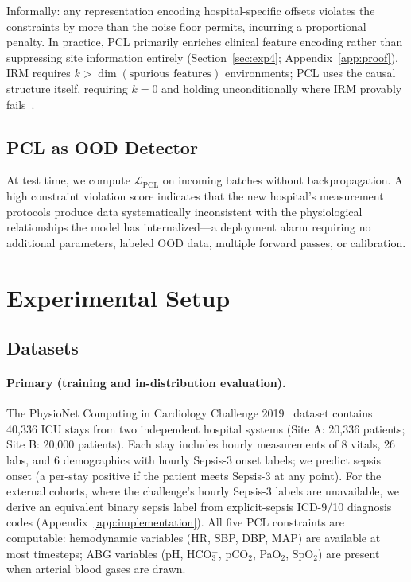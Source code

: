 \documentclass{article}
\begin{document}
Informally: any representation encoding hospital-specific offsets violates the constraints by more than the noise floor permits, incurring a proportional penalty. In practice, PCL primarily enriches clinical feature encoding rather than suppressing site information entirely (Section~\ref{sec:exp4}; Appendix~\ref{app:proof}). IRM requires $k > \dim(\text{spurious features})$ environments; PCL uses the causal structure itself, requiring $k = 0$ and holding unconditionally where IRM provably fails~\citep{rosenfeld2021risks}.

\subsection{PCL as OOD Detector}
\label{sec:ood_detector}

At test time, we compute $\mathcal{L}_{\text{PCL}}$ on incoming batches without backpropagation.
A high constraint violation score indicates that the new hospital's measurement protocols produce data systematically inconsistent with the physiological relationships the model has internalized---a deployment alarm requiring no additional parameters, labeled OOD data, multiple forward passes, or calibration.

\section{Experimental Setup}
\label{sec:setup}

\subsection{Datasets}

\paragraph{Primary (training and in-distribution evaluation).}
The PhysioNet Computing in Cardiology Challenge 2019~\citep{reyna2019early} dataset contains 40,336 ICU stays from two independent hospital systems (Site A: 20,336 patients; Site B: 20,000 patients).
Each stay includes hourly measurements of 8 vitals, 26 labs, and 6 demographics with hourly Sepsis-3 onset labels; we predict sepsis onset (a per-stay positive if the patient meets Sepsis-3 at any point). For the external cohorts, where the challenge's hourly Sepsis-3 labels are unavailable, we derive an equivalent binary sepsis label from explicit-sepsis ICD-9/10 diagnosis codes (Appendix~\ref{app:implementation}).
All five PCL constraints are computable: hemodynamic variables (HR, SBP, DBP, MAP) are available at most timesteps; ABG variables (pH, HCO$_3^-$, pCO$_2$, PaO$_2$, SpO$_2$) are present when arterial blood gases are drawn.
\end{document}
